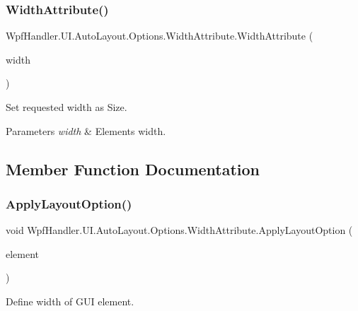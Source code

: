\subsubsection{\texorpdfstring{Width\+Attribute()}{WidthAttribute()}\hspace{0.1cm}{\footnotesize\ttfamily [2/2]}}
{\footnotesize\ttfamily Wpf\+Handler.\+U\+I.\+Auto\+Layout.\+Options.\+Width\+Attribute.\+Width\+Attribute (\begin{DoxyParamCaption}\item[{double}]{width }\end{DoxyParamCaption})}



Set requested width as Size. 


\begin{DoxyParams}{Parameters}
{\em width} & Element\textquotesingle{}s width.\\
\hline
\end{DoxyParams}


\subsection{Member Function Documentation}
\mbox{\label{class_wpf_handler_1_1_u_i_1_1_auto_layout_1_1_options_1_1_width_attribute_afdff5891e40ae82fc6282d78753ff644}} 
\subsubsection{\texorpdfstring{Apply\+Layout\+Option()}{ApplyLayoutOption()}}
{\footnotesize\ttfamily void Wpf\+Handler.\+U\+I.\+Auto\+Layout.\+Options.\+Width\+Attribute.\+Apply\+Layout\+Option (\begin{DoxyParamCaption}\item[{Framework\+Element}]{element }\end{DoxyParamCaption})}



Define width of G\+UI element. 



